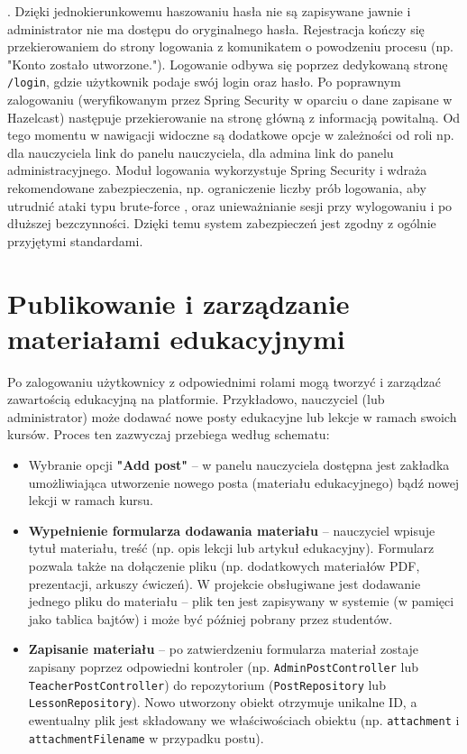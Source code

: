 . Dzięki jednokierunkowemu haszowaniu hasła nie są zapisywane jawnie i administrator nie ma dostępu do oryginalnego hasła. Rejestracja kończy się przekierowaniem do strony logowania z komunikatem o powodzeniu procesu (np. "Konto zostało utworzone."). Logowanie odbywa się poprzez dedykowaną stronę \texttt{/login}, gdzie użytkownik podaje swój login oraz hasło. Po poprawnym zalogowaniu (weryfikowanym przez Spring Security w oparciu o dane zapisane w Hazelcast) następuje przekierowanie na stronę główną z informacją powitalną. Od tego momentu w nawigacji widoczne są dodatkowe opcje w zależności od roli  np. dla nauczyciela link do panelu nauczyciela, dla admina link do panelu administracyjnego. Moduł logowania wykorzystuje Spring Security i wdraża rekomendowane zabezpieczenia, np. ograniczenie liczby prób logowania, aby utrudnić ataki typu brute-force \cite{spring-security-in-action-2e}, oraz unieważnianie sesji przy wylogowaniu i po dłuższej bezczynności. Dzięki temu system zabezpieczeń jest zgodny z ogólnie przyjętymi standardami. \section{Publikowanie i zarządzanie materiałami edukacyjnymi} Po zalogowaniu użytkownicy z odpowiednimi rolami mogą tworzyć i zarządzać zawartością edukacyjną na platformie. Przykładowo, nauczyciel (lub administrator) może dodawać nowe posty edukacyjne lub lekcje w ramach swoich kursów. Proces ten zazwyczaj przebiega według schematu: \begin{itemize}
\item Wybranie opcji \textbf{"Add post"} – w panelu nauczyciela dostępna jest zakładka umożliwiająca utworzenie nowego posta (materiału edukacyjnego) bądź nowej lekcji w ramach kursu.
\item \textbf{Wypełnienie formularza dodawania materiału} – nauczyciel wpisuje tytuł materiału, treść (np. opis lekcji lub artykuł edukacyjny). Formularz pozwala także na dołączenie pliku (np. dodatkowych materiałów PDF, prezentacji, arkuszy ćwiczeń). W projekcie obsługiwane jest dodawanie jednego pliku do materiału – plik ten jest zapisywany w systemie (w pamięci jako tablica bajtów) i może być później pobrany przez studentów.
\item \textbf{Zapisanie materiału} – po zatwierdzeniu formularza materiał zostaje zapisany poprzez odpowiedni kontroler (np. \texttt{AdminPostController} lub \texttt{TeacherPostController}) do repozytorium (\texttt{PostRepository} lub \texttt{LessonRepository}). Nowo utworzony obiekt otrzymuje unikalne ID, a ewentualny plik jest składowany we właściwościach obiektu (np. \texttt{attachment} i \texttt{attachmentFilename} w przypadku postu).

\end{itemize}
